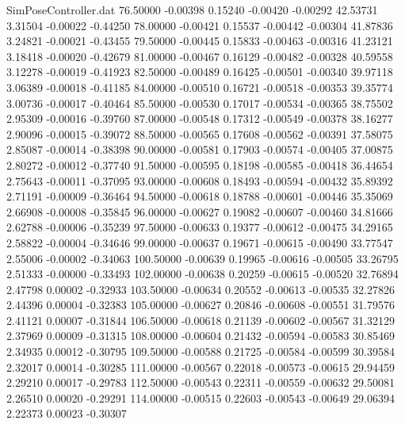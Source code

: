 \begin{filecontents}{SimPoseController.dat}
  76.50000   -0.00398    0.15240    -0.00420   -0.00292   42.53731    3.31504   -0.00022   -0.44250
  78.00000   -0.00421    0.15537    -0.00442   -0.00304   41.87836    3.24821   -0.00021   -0.43455
  79.50000   -0.00445    0.15833    -0.00463   -0.00316   41.23121    3.18418   -0.00020   -0.42679
  81.00000   -0.00467    0.16129    -0.00482   -0.00328   40.59558    3.12278   -0.00019   -0.41923
  82.50000   -0.00489    0.16425    -0.00501   -0.00340   39.97118    3.06389   -0.00018   -0.41185
  84.00000   -0.00510    0.16721    -0.00518   -0.00353   39.35774    3.00736   -0.00017   -0.40464
  85.50000   -0.00530    0.17017    -0.00534   -0.00365   38.75502    2.95309   -0.00016   -0.39760
  87.00000   -0.00548    0.17312    -0.00549   -0.00378   38.16277    2.90096   -0.00015   -0.39072
  88.50000   -0.00565    0.17608    -0.00562   -0.00391   37.58075    2.85087   -0.00014   -0.38398
  90.00000   -0.00581    0.17903    -0.00574   -0.00405   37.00875    2.80272   -0.00012   -0.37740
  91.50000   -0.00595    0.18198    -0.00585   -0.00418   36.44654    2.75643   -0.00011   -0.37095
  93.00000   -0.00608    0.18493    -0.00594   -0.00432   35.89392    2.71191   -0.00009   -0.36464
  94.50000   -0.00618    0.18788    -0.00601   -0.00446   35.35069    2.66908   -0.00008   -0.35845
  96.00000   -0.00627    0.19082    -0.00607   -0.00460   34.81666    2.62788   -0.00006   -0.35239
  97.50000   -0.00633    0.19377    -0.00612   -0.00475   34.29165    2.58822   -0.00004   -0.34646
  99.00000   -0.00637    0.19671    -0.00615   -0.00490   33.77547    2.55006   -0.00002   -0.34063
 100.50000   -0.00639    0.19965    -0.00616   -0.00505   33.26795    2.51333   -0.00000   -0.33493
 102.00000   -0.00638    0.20259    -0.00615   -0.00520   32.76894    2.47798    0.00002   -0.32933
 103.50000   -0.00634    0.20552    -0.00613   -0.00535   32.27826    2.44396    0.00004   -0.32383
 105.00000   -0.00627    0.20846    -0.00608   -0.00551   31.79576    2.41121    0.00007   -0.31844
 106.50000   -0.00618    0.21139    -0.00602   -0.00567   31.32129    2.37969    0.00009   -0.31315
 108.00000   -0.00604    0.21432    -0.00594   -0.00583   30.85469    2.34935    0.00012   -0.30795
 109.50000   -0.00588    0.21725    -0.00584   -0.00599   30.39584    2.32017    0.00014   -0.30285
 111.00000   -0.00567    0.22018    -0.00573   -0.00615   29.94459    2.29210    0.00017   -0.29783
 112.50000   -0.00543    0.22311    -0.00559   -0.00632   29.50081    2.26510    0.00020   -0.29291
 114.00000   -0.00515    0.22603    -0.00543   -0.00649   29.06394    2.22373    0.00023   -0.30307

\end{filecontents}
